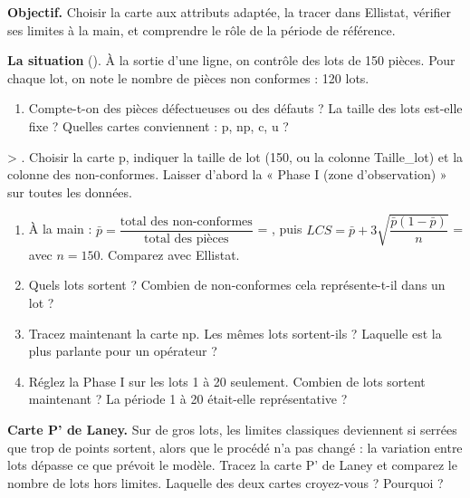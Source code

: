 \documentclass[10pt,a4paper]{article}
\begin{document}
\textbf{Objectif.} Choisir la carte aux attributs adaptée, la tracer dans Ellistat, vérifier ses limites à la main, et comprendre le rôle de la période de référence.

\textbf{La situation} (). À la sortie d'une ligne, on contrôle des lots de 150 pièces. Pour chaque lot, on note le nombre de pièces non conformes : 120 lots.

\begin{enumerate}[label=\textcolor{cyan}{\textbf{Q\arabic*.}},leftmargin=22pt]
\item Compte-t-on des pièces défectueuses ou des défauts ? La taille des lots est-elle fixe ? Quelles cartes conviennent : p, np, c, u ?\reponse[2]
\end{enumerate}

\begin{tcolorbox}[pas]
 > . Choisir la carte p, indiquer la taille de lot (150, ou la colonne Taille\_lot) et la colonne des non-conformes. Laisser d'abord la « Phase I (zone d'observation) » sur toutes les données.
\end{tcolorbox}

\begin{enumerate}[label=\textcolor{cyan}{\textbf{Q\arabic*.}},leftmargin=22pt,resume]
\item À la main : $\bar p = \dfrac{\text{total des non-conformes}}{\text{total des pièces}}$ = \champ{20mm}, puis $LCS = \bar p + 3\sqrt{\dfrac{\bar p(1-\bar p)}{n}}$ = \champ{20mm} avec $n = 150$. Comparez avec Ellistat.\reponse
\item Quels lots sortent ? Combien de non-conformes cela représente-t-il dans un lot ?\reponse
\item Tracez maintenant la carte np. Les mêmes lots sortent-ils ? Laquelle est la plus parlante pour un opérateur ?\reponse[2]
\item Réglez la Phase I sur les lots 1 à 20 seulement. Combien de lots sortent maintenant ? La période 1 à 20 était-elle représentative ?\reponse[2]
\end{enumerate}

\begin{tcolorbox}[defi]
\textbf{Carte P' de Laney.} Sur de gros lots, les limites classiques deviennent si serrées que trop de points sortent, alors que le procédé n'a pas changé : la variation entre lots dépasse ce que prévoit le modèle. Tracez la carte P' de Laney et comparez le nombre de lots hors limites. Laquelle des deux cartes croyez-vous ? Pourquoi ?
\end{tcolorbox}
\end{document}

